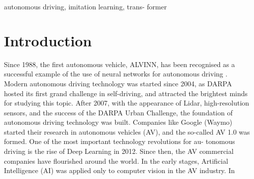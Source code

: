 \documentclass[conference]{IEEEtran}
\begin{document}
\begin{IEEEkeywords}
autonomous driving, imitation learning, trans- former
\end{IEEEkeywords}

\section{Introduction}
Since 1988, the first autonomous vehicle, ALVINN, has been recognised as a successful example of the use of neural networks for autonomous driving \cite{pomerleau1988alvinn}. Modern autonomous driving technology was started since 2004, as DARPA \cite{darpa} hosted its first grand challenge in self-driving, and attracted the brightest minds for studying this topic. After 2007, with the appearance of Lidar, high-resolution sensors, and the success of the DARPA Urban Challenge, the foundation of autonomous driving technology was built. Companies like Google (Waymo) started their research in autonomous vehicles (AV), and the so-called AV 1.0 was formed.
One of the most important technology revolutions for au- tonomous driving is the rise of Deep Learning in 2012. Since then, the AV commercial companies have flourished around the world. In the early stages, Artificial Intelligence (AI) was applied only to computer vision in the AV industry. In
\end{document}
